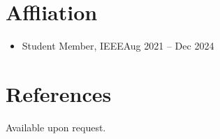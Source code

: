 \documentclass[10pt,margin,line,pifont,palatino,courier]{res}
\begin{document}
\begin{resume}
\section{\sc Affliation}

\begin{itemize}[leftmargin=*]
    \item Student Member, IEEE\hfill Aug 2021 -- Dec 2024
\end{itemize}

\section{\sc References}
{\sc Available upon request.}

%


\end{resume}
\end{document}
